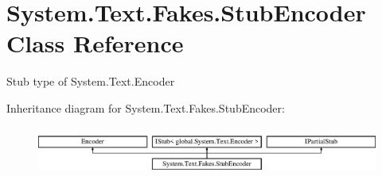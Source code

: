\hypertarget{class_system_1_1_text_1_1_fakes_1_1_stub_encoder}{\section{System.\-Text.\-Fakes.\-Stub\-Encoder Class Reference}
\label{class_system_1_1_text_1_1_fakes_1_1_stub_encoder}
}


Stub type of System.\-Text.\-Encoder 


Inheritance diagram for System.\-Text.\-Fakes.\-Stub\-Encoder\-:\begin{figure}[H]
\begin{center}
\leavevmode
\includegraphics[height=1.630277cm]{class_system_1_1_text_1_1_fakes_1_1_stub_encoder}
\end{center}
\end{figure}
